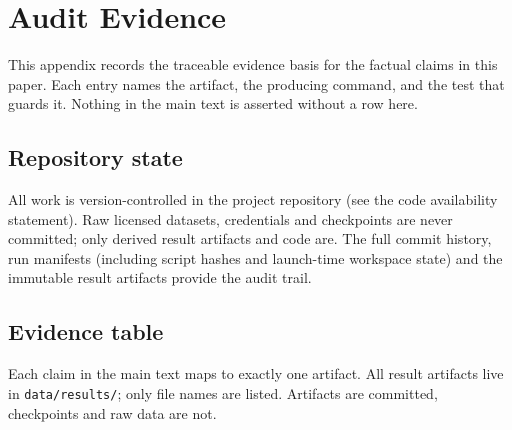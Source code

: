 \section{Audit Evidence}
\label{sec:audit}

This appendix records the traceable evidence basis for the factual claims in this
paper. Each entry names the artifact, the producing command, and the test that
guards it. Nothing in the main text is asserted without a row here.

\subsection{Repository state}

All work is version-controlled in the project repository (see the code
availability statement). Raw licensed datasets, credentials and checkpoints
are never committed; only derived result artifacts and code are. The full
commit history, run manifests (including script hashes and launch-time
workspace state) and the immutable result artifacts provide the audit trail.

\subsection{Evidence table}

Each claim in the main text maps to exactly one artifact. All result artifacts
live in \texttt{data/results/}; only file names are listed. Artifacts are
committed, checkpoints and raw data are not.

